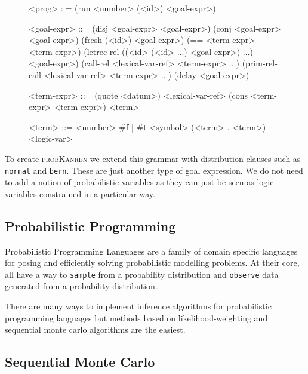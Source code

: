 \documentclass[
]{ceurart}
\begin{document}
\begin{figure}
\begin{grammar}
<prog> ::= (run <number> (<id>) <goal-expr>)

<goal-expr> ::= (disj <goal-expr> <goal-expr>) \alt
	        (conj <goal-expr> <goal-expr>) \alt
                (fresh (<id>) <goal-expr>) \alt
		(== <term-expr> <term-expr>) \alt
		(letrec-rel ((<id> (<id> ...) <goal-expr>) ...) \\
		\hspace{\grammarindent} <goal-expr>) \alt
		(call-rel <lexical-var-ref> <term-expr> ...) \alt
		(prim-rel-call <lexical-var-ref> <term-expr> ...) \alt
		(delay <goal-expr>)

<term-expr> ::= (quote <datum>) \alt
                <lexical-var-ref> \alt
                (cons <term-expr> <term-expr>) \alt
                <term>

<term> ::= <number> \alt
           \#f | \#t \alt
	   <symbol> \alt
	   (<term> . <term>) \alt
	   <logic-var>

\end{grammar}
\end{figure}

To create \textsc{probKanren} we extend this grammar with distribution clauses
such as \texttt{normal} and \texttt{bern}. These are just another type
of goal expression. We do not need to add a notion of probabilistic
variables as they can just be seen as logic variables constrained in
a particular way.


\subsection{Probabilistic Programming}

Probabilistic Programming Languages\cite{wood2014new,
  van2018introduction} are a family of domain specific languages for
posing and efficiently solving probabilistic modelling problems. At
their core, all have a way to \texttt{sample} from a probability
distribution and \texttt{observe} data generated from a probability
distribution.

There are many ways to implement inference algorithms for probabilistic
programming languages but methods based on likelihood-weighting and
sequential monte carlo algorithms are the easiest.

\subsection{Sequential Monte Carlo}
\end{document}

